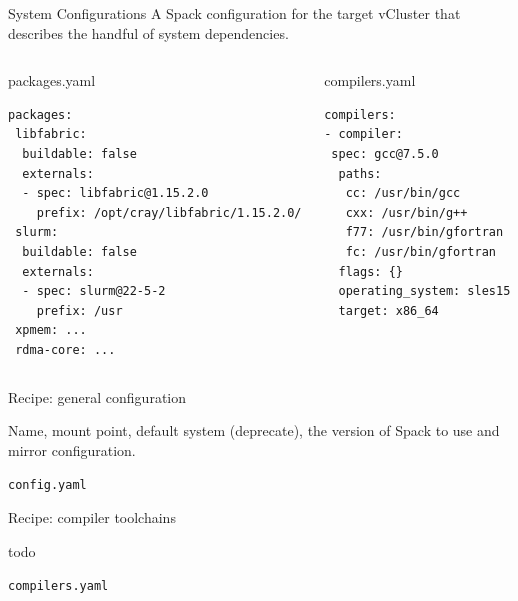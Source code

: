 \documentclass[aspectratio=43]{beamer}
\begin{document}
\begin{frame}[fragile]{System Configurations}
    A Spack configuration for the target vCluster that describes the handful of system dependencies.

    \begin{columns}[T]
        \begin{column}{0.5\textwidth}
        \begin{codecolumn}{packages.yaml}
            \begin{lstlisting}[style=talkyaml]
packages:
 libfabric:
  buildable: false
  externals:
  - spec: libfabric@1.15.2.0
    prefix: /opt/cray/libfabric/1.15.2.0/
 slurm:
  buildable: false
  externals:
  - spec: slurm@22-5-2
    prefix: /usr
 xpmem: ...
 rdma-core: ...
            \end{lstlisting}
        \end{codecolumn}
        \end{column}
        \begin{column}{0.5\textwidth}
        \begin{codecolumn}{compilers.yaml}
            \begin{lstlisting}[style=talkyaml]
compilers:
- compiler:
 spec: gcc@7.5.0
  paths:
   cc: /usr/bin/gcc
   cxx: /usr/bin/g++
   f77: /usr/bin/gfortran
   fc: /usr/bin/gfortran
  flags: {}
  operating_system: sles15
  target: x86_64
            \end{lstlisting}
        \end{codecolumn}
        \end{column}
    \end{columns}
\end{frame}

\begin{frame}[fragile]{Recipe: general configuration}

Name, mount point, default system (deprecate), the version of Spack to use and mirror configuration.

\begin{code}{\lstinline{config.yaml}}

\end{code}

\end{frame}

\begin{frame}[fragile]{Recipe: compiler toolchains}

todo

\begin{code}{\lstinline{compilers.yaml}}

\end{code}

\end{frame}
\end{document}
